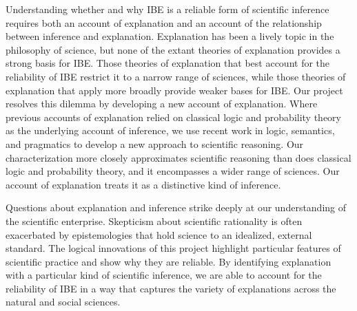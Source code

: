 \documentclass{article}[11pt]
\begin{document}
Understanding whether and why IBE is a reliable form of scientific inference requires both an account of explanation and an account of the relationship between inference and explanation.  Explanation has been a lively topic in the philosophy of science, but none of the extant theories of explanation provides a strong basis for IBE.  Those theories of explanation that best account for the reliability of IBE restrict it to a narrow range of sciences, while those theories of explanation that apply more broadly provide weaker bases for IBE.  Our project resolves this dilemma by developing a new account of explanation. Where previous accounts of explanation relied on classical logic and probability theory as the underlying account of inference, we use recent work in logic, semantics, and pragmatics to develop a new approach to scientific reasoning. Our characterization more closely approximates scientific reasoning than does classical logic and probability theory, and it encompasses a wider range of sciences.  Our account of explanation treats it as a distinctive kind of inference.  

Questions about explanation and inference strike deeply at our understanding of the scientific enterprise.  Skepticism about scientific rationality is often exacerbated by epistemologies that hold science to an idealized, external standard.  The logical innovations of this project highlight particular features of scientific practice and show why they are reliable.  By identifying explanation with a particular kind of scientific inference, we are able to account for the reliability of IBE in a way that captures the variety of explanations across the natural and social sciences.   




\end{document}
